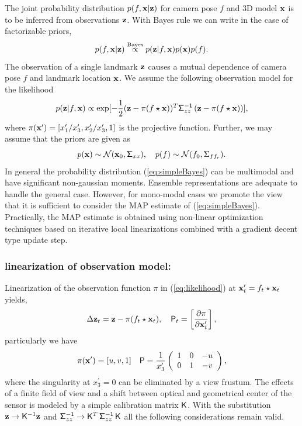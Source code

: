 \documentclass[conference]{IEEEtran}
\newcommand{\sigmazz}{\mathsf{\Sigma^{-1}_\mathnormal{zz}}}
\newcommand{\beq}{\begin{equation}}
\newcommand{\eeq}{\end{equation}}
\begin{document}
The joint probability distribution $p(f,{\bf x} | {\bf z})$ for camera pose $f$ and 3D model ${\bf x}$ is to be inferred from
observations ${\bf z}$. With Bayes rule we can write in the case of factorizable priors,
\beq
    p(f,{\bf x}| {\bf z}) \stackrel{\rm Bayes}{\propto} p({\bf z}| f,{\bf x})p({\bf x})p( f).
    \label{eq:simpleBayes}
\eeq
The observation of a single landmark ${\bf z}$ causes a mutual dependence of camera pose $f$ and
landmark location ${\bf x}$. We assume the following observation model for the likelihood
\beq
    p( {\bf z}| f,{\bf x} ) \propto \exp[ -{1\over 2} ({\bf z}-\pi( f\star {\bf x}))^T
    \sigmazz \, ({\bf z}-\pi( f\star {\bf x})) ], \label{eq:likelihood}
\eeq
where $\pi({\bf x}') = [x_1^\prime/x_3^\prime,x_2^\prime/x_3^\prime,1]$ is the projective function.
Further, we may assume that the priors are given as
\beq
    p( {\bf x} ) \sim {\cal N}({\bf x}_0, \mathsf{\Sigma}_{xx} ),\quad p( f ) \sim {\cal N}( f_0, \Sigma_{ff_r} ).
    \label{eq:simpPriors}
\eeq
In general the probability distribution (\ref{eq:simpleBayes}) can be multimodal and have significant non-gaussian moments.
Ensemble representations are adequate to handle the general case. However, for mono-modal cases we promote
the view that it is sufficient to consider
the MAP estimate of (\ref{eq:simpleBayes}). Practically, the MAP estimate is obtained using non-linear optimization
techniques based on iterative local linearizations combined with a gradient decent type update step.

\subsubsection{linearization of observation model:}

Linearization of the observation function $\pi$ in (\ref{eq:likelihood}) at ${\bf x}^\prime_t = f_t\star{\bf x}_t$
yields,
\beq
    \Delta {\bf z}_t = {\bf z} - \pi(f_t\star {\bf x}_t),\quad {\sf P}_t =
    \left[ {\partial \pi\over \partial {\bf x}^\prime_t} \right],
\eeq
particularly we have
\beq
    \pi({\bf x}^\prime)=[u,v,1] \quad
    {\sf P}={1\over x_3^\prime}\left(
    \begin{array}{ccc}
        1 & 0 & -u \\
        0 & 1 & -v \\
    \end{array} \right), \label{eq:projectivefunc}
\eeq
where the singularity at $x_3^\prime=0$ can be eliminated by a view frustum. The effects of a
finite field of view and a shift between optical and geometrical center of the sensor is modeled by a
simple calibration matrix ${\sf K}$. With the substitution
${\bf z} \rightarrow {\sf K}^{-1}{\bf z}$ and $\sigmazz \rightarrow {\sf K}^T\, \sigmazz \, {\sf K}$
all the following considerations remain valid.
\end{document}
